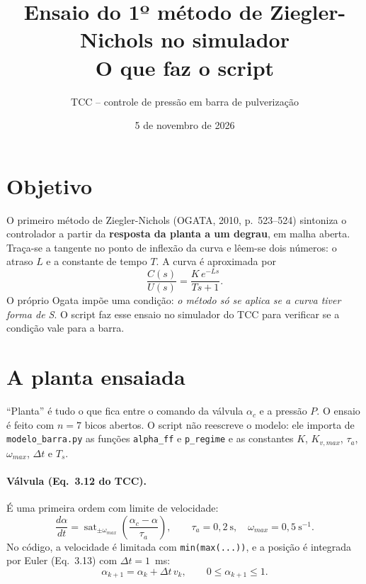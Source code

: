 \documentclass[11pt,a4paper]{article}
\title{Ensaio do 1º método de Ziegler-Nichols no simulador\\[2pt]
\large O que faz o script \cod{simulacao/ensaio\_zn1.py}}
\author{TCC -- controle de pressão em barra de pulverização}
\date{5 de novembro de 2026}
\newcommand{\cod}[1]{\texttt{\color{black!75}#1}}
\begin{document}
\maketitle

\section{Objetivo}

O primeiro método de Ziegler-Nichols (OGATA, 2010, p.~523--524) sintoniza o controlador a partir
da \textbf{resposta da planta a um degrau}, em malha aberta. Traça-se a tangente no ponto de
inflexão da curva e lêem-se dois números: o atraso $L$ e a constante de tempo $T$. A curva é
aproximada por
\begin{equation}
  \frac{C(s)}{U(s)} = \frac{K\,e^{-Ls}}{Ts+1}.
\end{equation}
O próprio Ogata impõe uma condição: \emph{o método só se aplica se a curva tiver forma de S}.
O script faz esse ensaio no simulador do TCC para verificar se a condição vale para a barra.

\section{A planta ensaiada}

``Planta'' é tudo o que fica entre o comando da válvula $\alpha_c$ e a pressão $P$. O ensaio é
feito com $n = 7$ bicos abertos. O script não reescreve o modelo: ele importa de
\cod{modelo\_barra.py} as funções \cod{alpha\_ff} e \cod{p\_regime} e as constantes
$K$, $K_{v,max}$, $\tau_a$, $\omega_{max}$, $\Delta t$ e $T_s$.

\paragraph{Válvula (Eq.~3.12 do TCC).} É uma primeira ordem com limite de velocidade:
\begin{equation}
  \frac{d\alpha}{dt} = \operatorname{sat}_{\pm\omega_{max}}\!\left(\frac{\alpha_c - \alpha}{\tau_a}\right),
  \qquad \tau_a = 0{,}2\ \text{s},\quad \omega_{max} = 0{,}5\ \text{s}^{-1}.
\end{equation}
No código, a velocidade é limitada com \cod{min(max(...))}, e a posição é integrada por
Euler (Eq.~3.13) com $\Delta t = 1$~ms:
\begin{equation}
  \alpha_{k+1} = \alpha_k + \Delta t\, v_k ,\qquad 0 \le \alpha_{k+1} \le 1 .
\end{equation}
\end{document}
